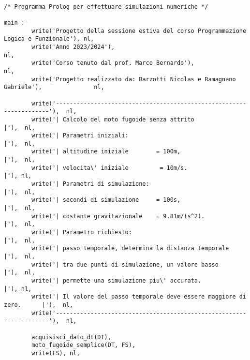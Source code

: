 
\scriptsize
\begin{verbatim}
   
/* Programma Prolog per effettuare simulazioni numeriche */

main :- 
        write('Progetto della sessione estiva del corso Programmazione Logica e Funzionale'), nl,
        write('Anno 2023/2024'),                                                              nl,
        write('Corso tenuto dal prof. Marco Bernardo'),                                       nl,
        write('Progetto realizzato da: Barzotti Nicolas e Ramagnano Gabriele'),               nl, 

        write('--------------------------------------------------------------------'),  nl,
        write('| Calcolo del moto fugoide senza attrito                           |'),  nl,
        write('| Parametri iniziali:                                              |'),  nl,
        write('| altitudine iniziale        = 100m,                               |'),  nl,
        write('| velocita\' iniziale         = 10m/s.                              |'), nl,
        write('| Parametri di simulazione:                                        |'),  nl,
        write('| secondi di simulazione     = 100s,                               |'),  nl,
        write('| costante gravitazionale    = 9.81m/(s^2).                        |'),  nl,
        write('| Parametro richiesto:                                             |'),  nl,
        write('| passo temporale, determina la distanza temporale                 |'),  nl,
        write('| tra due punti di simulazione, un valore basso                    |'),  nl,
        write('| permette una simulazione piu\' accurata.                          |'), nl,
        write('| Il valore del passo temporale deve essere maggiore di zero.      |'),  nl,
        write('--------------------------------------------------------------------'),  nl,

        acquisisci_dato_dt(DT),                                                        
        moto_fugoide_semplice(DT, FS),
        write(FS), nl,


\end{verbatim}
